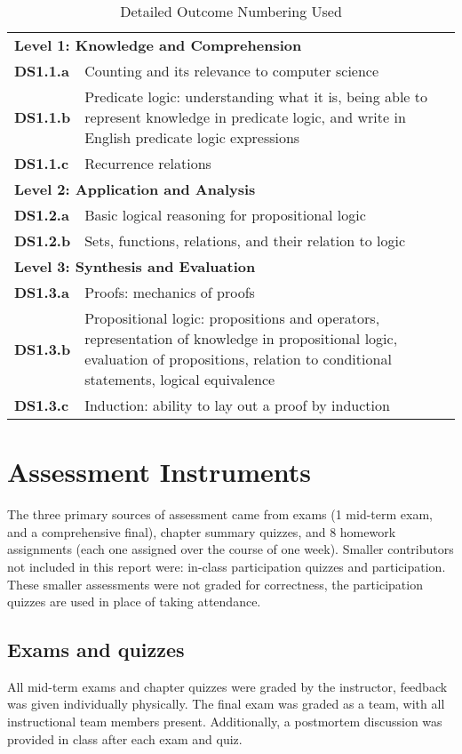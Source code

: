 \documentclass[11pt]{article}
\begin{document}
\begin{table}
    \centering
    \caption{Detailed Outcome Numbering Used}
    {\small
    \label{tab:outcomes}
    \begin{tabularx}{\linewidth}{|l|X|}
    \hline
	\multicolumn{2}{|l|}{\textbf{Level 1: Knowledge and Comprehension }}\\
	\textbf{DS1.1.a} & Counting and its relevance to computer science\\
	\textbf{DS1.1.b} & Predicate logic: understanding what it is, being able to represent knowledge in 
predicate logic, and write in English predicate logic expressions\\
	\textbf{DS1.1.c} & Recurrence relations\\
	\hline
\multicolumn{2}{|l|}{\textbf{Level 2: Application and Analysis}}\\
\textbf{DS1.2.a} & Basic logical reasoning for propositional logic \\
\textbf{DS1.2.b} &Sets, functions, relations, and their relation to logic\\
\hline
\multicolumn{2}{|l|}{\textbf{Level 3: Synthesis and Evaluation }}\\
\textbf{DS1.3.a} &Proofs: mechanics of proofs\\
\textbf{DS1.3.b} &Propositional logic: propositions and operators, representation of knowledge in 
propositional logic, evaluation of propositions, relation to conditional statements, 
logical equivalence\\
\textbf{DS1.3.c} &Induction: ability to lay out a proof by induction\\
\hline \hline
    \end{tabularx}
    }
\end{table}

\section{Assessment Instruments}
\label{sec:assessment}
The three primary sources of assessment came from exams (1 mid-term exam, and a comprehensive final),
chapter summary quizzes, 
and 8 homework assignments (each one assigned over the course of one week). 
Smaller contributors not included in this report were: in-class participation quizzes and participation. 
These smaller assessments were not graded for correctness, 
the participation quizzes are used in place of taking attendance. 

\subsection{Exams and quizzes}
All mid-term exams and chapter quizzes were graded by the instructor, feedback was given individually physically.
The final exam was graded as a team, with all instructional team members present. 
Additionally, a postmortem discussion was provided in class after each exam and quiz. 
\end{document}
